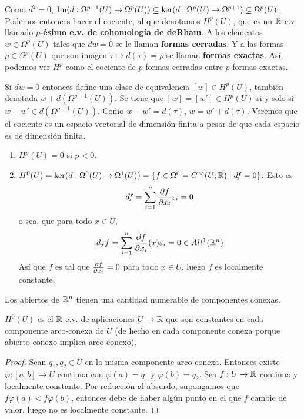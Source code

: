 \documentclass[CV.tex]{subfiles}
\begin{document}
\vspace{0.5cm}

Como $d^2=0$, $\operatorname{Im}(d:\Omega^{p-1}(U)\to\Omega^p(U))\subseteq\ker(d:\Omega^p(U)\to\Omega^{p+1})\subseteq\Omega^p(U)$. Podemos entonces hacer el cociente, al que denotamos $H^p(U)$, que es un $\mathbb{R}$-e.v. llamado \textbf{$p$-ésimo e.v. de cohomología de deRham}. A los elementos $w\in\Omega^p(U)$ tales que $dw=0$ se le llaman \textbf{formas cerradas}. Y a las formas $\rho\in\Omega^p(U)$ que son imagen $\tau\mapsto d(\tau)=\rho$ se llaman \textbf{formas exactas}. Así, podemos ver $H^p$ como el cociente de $p$-formas cerradas entre $p$-formas exactas. 

Si $dw=0$ entonces define una clase de equivalencia $[w]\in H^p(U)$, también denotada $w+d(\Omega^{p-1}(U))$. Se tiene que $[w]=[w']\in H^p(U)$ si y solo si $w-w'\in d(\Omega^{p-1}(U))$. Como $w-w'=d(\tau)$, $w=w'+d(\tau)$. Veremos que el cociente es un espacio vectorial de dimensión finita a pesar de que cada espacio es de dimensión finita. 

\begin{ej}
\begin{enumerate}
\item $H^p(U)=0$ si $p<0$.
\item $H^0(U)=\ker(d:\Omega^0(U)\to\Omega^1(U))=\{f\in\Omega^0=C^{\infty}(U;\mathbb{R})\mid df=0\}$. Esto es
\[
df=\sum_{i=1}^n\frac{\partial f}{\partial x_i}\varepsilon_i=0
\]
o sea, que para todo $x\in U$,
\[
d_xf=\sum_{i=1}^n\frac{\partial f}{\partial x_i}(x)\varepsilon_i=0\in Alt^1(\mathbb{R}^n)
\]
Así que $f$ es tal que $\frac{\partial f}{\partial x_i}=0$ para todo $x\in U$, luego $f$ es localmente constante.
\end{enumerate}
\end{ej}

\begin{nota}
Los abiertos de $\mathbb{R}^n$ tienen una cantidad numerable de componentes conexas. 
\end{nota}


\begin{lemma}
$H^0(U)$ es el $\mathbb{R}$-e.v. de aplicaciones $U\to\mathbb{R}$ que son constantes en cada componente arco-conexa de $U$ (de hecho en cada componente conexa porque abierto conexo implica arco-conexo). 
\end{lemma}
\begin{proof}
Sean $q_1,q_2\in U$ en la misma componente arco-conexa. Entonces existe $\varphi:[a,b]\to U$ continua con $\varphi(a)=q_1$ y $\varphi(b)=q_2$. Sea $f:U\to \mathbb{R}$ continua y localmente constante. Por reducción al absurdo, supongamos que $f\varphi(a)<f\varphi(b)$, entonces debe de haber algún punto en el que $f$ cambie de valor, luego no es localmente constante.
\end{proof}
\end{document}
